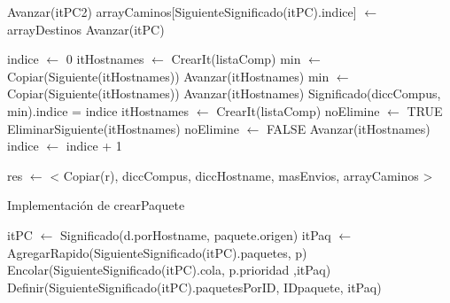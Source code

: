 \begin{Algoritmos}
\begin{algorithm}
\begin{algorithmic}[0]

	
			\State Avanzar(itPC2) 
		\EndWhile
		\State arrayCaminos[SiguienteSignificado(itPC).indice] $\gets$ arrayDestinos 
		\State Avanzar(itPC) 
	\EndWhile

	\State indice $\gets$  0 	
	   
		\State itHostnames $\gets$ CrearIt(listaComp) 
		\State min $\gets$ Copiar(Siguiente(itHostnames)) 
		\State Avanzar(itHostnames) 
			 
				\State min $\gets$ Copiar(Siguiente(itHostnames)) 
			\EndIf
			\State Avanzar(itHostnames) 
		\EndWhile
		\State Significado(diccCompus, min).indice = indice 
		\State itHostnames $\gets$ CrearIt(listaComp) 
		\State noElimine $\gets$ TRUE 
		  
			 
				\State EliminarSiguiente(itHostnames) 
				\State noElimine $\gets$ FALSE 
			\EndIf
			\State Avanzar(itHostnames) 
		\EndWhile
		\State indice $\gets$ indice + 1 
	\EndWhile
	
	
	\State res $\gets$ < Copiar(r), diccCompus, diccHostname, masEnvios, arrayCaminos > 
	
\EndFunction
\end{algorithmic}
\end{algorithm}

\begin{algorithm}
\caption{Implementaci\'on de crearPaquete}
\begin{algorithmic}[0]
	\State itPC $\gets$ Significado(d.porHostname, paquete.origen) 
	\State itPaq $\gets$ AgregarRapido(SiguienteSignificado(itPC).paquetes, p)  
	\State Encolar(SiguienteSignificado(itPC).cola, p.prioridad ,itPaq)	
	\State Definir(SiguienteSignificado(itPC).paquetesPorID, IDpaquete, itPaq) 
\EndFunction {}
\end{algorithmic}
\end{algorithm}


\end{Algoritmos}
